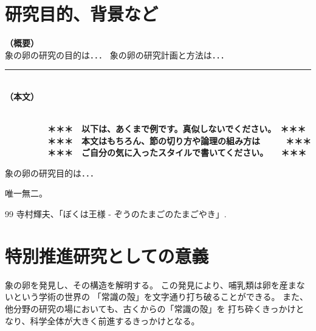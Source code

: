 \documentclass[11pt,a4j,dvipdfmx]{jarticle} 					%
\newcommand{\研究課題名}{象の卵}
\newcommand{\研究機関名}{逢坂大学}
\newcommand{\研究代表者氏名}{湯川秀樹}
\newcommand{\研究期間の最終元号年度}{9}  %
\begin{document}

\section{研究目的、背景など}

\noindent
\mbox{\textbf{（概要）}}\\
	象の卵の研究の目的は．．．	
	象の卵の研究計画と方法は．．．

\noindent
\rule{\linewidth}{1pt}\\
\noindent
\mbox{\textbf{（本文）}}
\JSPSInstructions	%

\textbf{\\　　　　　＊＊＊　以下は、あくまで例です。真似しないでください。　＊＊＊\\
　　　　　＊＊＊　本文はもちろん、節の切り方や論理の組み方は　　　＊＊＊\\
　　　　　＊＊＊　ご自分の気に入ったスタイルで書いてください。　　＊＊＊}

	 象の卵の研究目的は．．．

	唯一無二。




	\vspace{1cm}
	\begin{thebibliography}{99}
		 寺村輝夫、「ぼくは王様 - ぞうのたまごのたまごやき」.
	\end{thebibliography}




\section{特別推進研究としての意義}

	象の卵を発見し、その構造を解明する。
	この発見により、哺乳類は卵を産まないという学術の世界の
	「常識の殻」を文字通り打ち破ることができる。
	また、他分野の研究の場においても、古くからの「常識の殻」を
	打ち砕くきっかけとなり、科学全体が大きく前進するきっかけとなる。
\end{document}
